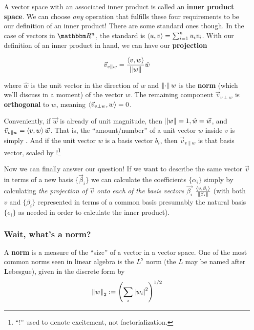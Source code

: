 \documentclass[letterpaper,12pt]{report}
\begin{document}
A vector space with an associated inner product is called an \textbf{inner product space}.
We can choose \emph{any} operation that fulfills these four requirements to be our
definition of an inner product! There are some standard ones though.
In the case of vectors in \(\domain{R^n}\), the standard is
\(\innerprod[u][v] = \sum_{i=1}^{n}u_i v_i \).
With our definition of an inner product in hand, we can have our \textbf{projection}

\begin{equation}
\vec{v}_{v\parallel w} = \frac{\innerprod[v][w]}{\norm[w]} \hat{w}
\end{equation}\label{equation:projection}

where \(\hat{w}\) is the unit vector in the direction of \(w\) and \(\norm{w}\)
is the
\textbf{norm} (which we'll discuss in a moment)
of the vector \(w\).
The remaining component \(\vec{v}_{v\perp w}\) is \textbf{orthogonal} to \(w\),
meaning \(\innerprod[\vec{v}_{v\perp w}][w] = 0\).
\par 

Conveniently, if \(\vec{w}\) is already of unit magnitude, 
then \(\norm[w] = 1, \hat{w} = \vec{w}\), and
\(\vec{v}_{v\parallel w} = \innerprod[v][w]\vec{w}\).
That is, the ``amount/number'' of a 
unit vector \(w\) inside \(v\) is simply \innerprod[u][v].
And if the unit vector \(w\) is a basis vector \(b_i\), then 
\(\vec{v}_{v\parallel w}\) is 
that basis vector, scaled by \innerprod[v][b_i]!\footnote{
  ``!'' used to denote excitement, not factorialization.
}
\par

Now we can finally answer our question! 
If we want to describe the same vector \(\vec{v}\)
in terms of a new basis \(\{\vec{\beta}_i\}\) 
we can calculate the coefficients \(\{\alpha_i\}\)
simply by calculating \emph{the projection of \(\vec{v}\)
onto each of the basis vectors \(\vec{\beta_i}\)}
\(\frac{\innerprod[v][\beta_i]}{\norm[\beta_i]}\)
(with both \(v\) and \(\{\beta_i\}\) represented
in terms of a common basis
\textemdash{} presumably the natural basis \(\{e_i\}\) \textemdash{}
as needed in order to calculate the inner product).

\subsubsection*{Wait, what's a norm?}

A \textbf{norm} is a measure of the ``size''
of a vector in a vector space.
One of the most common norms seen
in linear algebra is
the \(L^2\) norm 
(the \(L\) may be named after \textbf{L}ebesgue), 
given in the discrete form by
\[\norm[w]_2 := \left(\sum_{i} \abs{w_i}^2\right)^{1/2}\]
\end{document}
